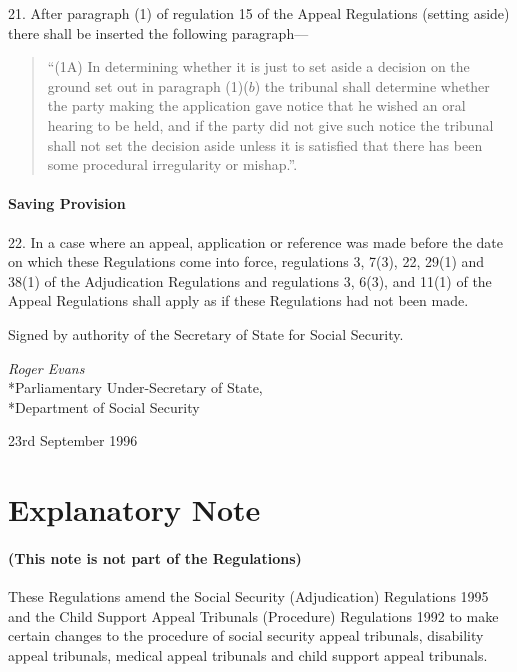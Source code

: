 \documentclass[a4paper]{article}
\newcommand{\parthead}{}
\begin{document}
21.  After paragraph (1) of regulation 15 of the Appeal Regulations (setting aside) there shall be inserted the following paragraph—
\begin{quotation}
“(1A) In determining whether it is just to set aside a decision on the ground set out in paragraph (1)($b$) the tribunal shall determine whether the party making the application gave notice that he wished an oral hearing to be held, and if the party did not give such notice the tribunal shall not set the decision aside unless it is satisfied that there has been some procedural irregularity or mishap.”.
\end{quotation}

\subsection[22. Saving Provision]{Saving Provision}

22.  In a case where an appeal, application or reference was made before the date on which these Regulations come into force, regulations 3, 7(3), 22, 29(1) and 38(1) of the Adjudication Regulations and regulations 3, 6(3), and 11(1) of the Appeal Regulations shall apply as if these Regulations had not been made.

\bigskip

Signed by authority of the Secretary of State for Social Security.

{\raggedleft
\emph{Roger Evans}\\*Parliamentary Under-Secretary of State,\\*Department of Social Security

}

23rd September 1996

\bigskip

\part{Explanatory Note}

\renewcommand\parthead{--- Explanatory Note}

\subsection*{(This note is not part of the Regulations)}

These Regulations amend the Social Security (Adjudication) Regulations 1995 and the Child Support Appeal Tribunals (Procedure) Regulations 1992 to make certain changes to the procedure of social security appeal tribunals, disability appeal tribunals, medical appeal tribunals and child support appeal tribunals.
\end{document}
